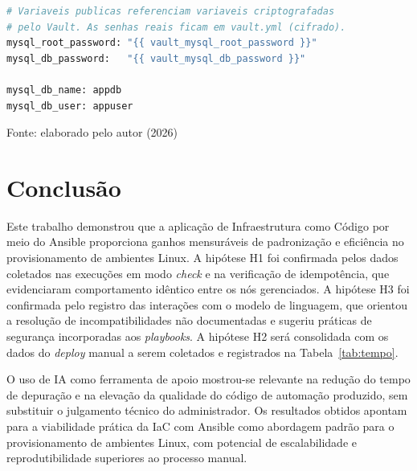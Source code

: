 \documentclass[12pt]{article}
\newenvironment{quadro}[1][H]
  {\begin{table}[#1]\centering}
  {\end{table}}
\newcommand{\fonte}[1]{%
  \begin{flushleft}
    \footnotesize Fonte: #1
  \end{flushleft}%
}
\begin{document}
\begin{quadro}[H]
  \caption{Proteção de credenciais com Ansible Vault}
  \label{quad:vault}
  \begin{lstlisting}[language=bash]
# Variaveis publicas referenciam variaveis criptografadas
# pelo Vault. As senhas reais ficam em vault.yml (cifrado).
mysql_root_password: "{{ vault_mysql_root_password }}"
mysql_db_password:   "{{ vault_mysql_db_password }}"

mysql_db_name: appdb
mysql_db_user: appuser
  \end{lstlisting}
  \fonte{elaborado pelo autor (2026)}
\end{quadro}


\section{Conclusão}

Este trabalho demonstrou que a aplicação de Infraestrutura como Código por
meio do Ansible proporciona ganhos mensuráveis de padronização e eficiência
no provisionamento de ambientes Linux. A hipótese H1 foi confirmada pelos
dados coletados nas execuções em modo \textit{check} e na verificação de
idempotência, que evidenciaram comportamento idêntico entre os nós gerenciados.
A hipótese H3 foi confirmada pelo registro das interações com o modelo de
linguagem, que orientou a resolução de incompatibilidades não documentadas e
sugeriu práticas de segurança incorporadas aos \textit{playbooks}. A hipótese
H2 será consolidada com os dados do \textit{deploy} manual a serem coletados
e registrados na Tabela~\ref{tab:tempo}.

O uso de IA como ferramenta de apoio mostrou-se relevante na redução do tempo
de depuração e na elevação da qualidade do código de automação produzido,
sem substituir o julgamento técnico do administrador. Os resultados obtidos
apontam para a viabilidade prática da IaC com Ansible como abordagem padrão
para o provisionamento de ambientes Linux, com potencial de escalabilidade e
reprodutibilidade superiores ao processo manual.
\fi 



\end{document}
